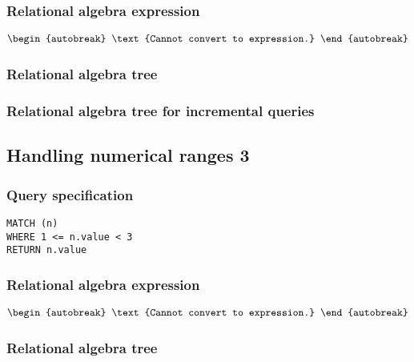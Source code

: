 \subsubsection*{Relational algebra expression}

\begin{align*}
\begin{autobreak}
\text{Cannot convert to expression.}
\end{autobreak}
\end{align*}

\subsubsection*{Relational algebra tree}


\subsubsection*{Relational algebra tree for incremental queries}


\subsection{Handling numerical ranges 3}

\subsubsection*{Query specification}

\begin{lstlisting}
MATCH (n)
WHERE 1 <= n.value < 3
RETURN n.value
\end{lstlisting}

\subsubsection*{Relational algebra expression}

\begin{align*}
\begin{autobreak}
\text{Cannot convert to expression.}
\end{autobreak}
\end{align*}

\subsubsection*{Relational algebra tree}

